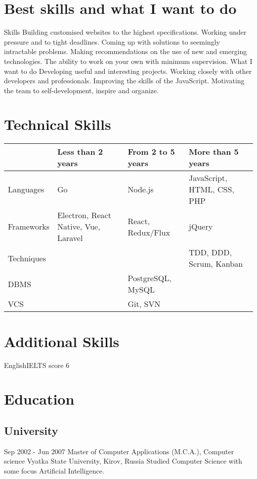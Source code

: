 \documentclass[11pt,a4paper]{moderncv}
\begin{document}
\maketitle
\section{Best skills and what I want to do}
  \cvline
    {Skills}{
      Building customised websites to the highest specifications.
      Working under pressure and to tight deadlines.
      Coming up with solutions to seemingly intractable problems.
      Making recommendations on the use of new and emerging technologies.
      The ability to work on your own with minimum supervision.}
  \cvline
    {What I want to do}{
      Developing useful and interesting projects.
      Working closely with other developers and professionals.
      Improving the skills of the JavaScript.
      Motivating the team to self-development, inspire and organize.}

\section{Technical Skills}

\begin{tabular}{ l||m{4cm}|m{4cm}|m{4cm}|  }
  & Less than 2 years & From 2 to 5 years & More than 5 years \\
  \hline\hline
  Languages & Go & Node.js & JavaScript, HTML, CSS, PHP \\
  \hline
  Frameworks & Electron, React Native, Vue, Laravel & React, Redux/Flux & jQuery \\
  \hline
  Techniques & & & TDD, DDD, Scrum, Kanban \\
  \hline
  DBMS & & PostgreSQL, MySQL & \\
  \hline
  VCS & & Git, SVN & \\
  \hline
\end{tabular}

\section{Additional Skills}
  \cvline
    {English}{IELTS score 6}

\section{Education}
  \subsection{University}
  \cventry
    {Sep 2002 - Jun 2007}
    {Master of Computer Applications (M.C.A.), Computer science}
    {\newline Vyatka State University, Kirov, Russia}
    {}{}
    {Studied Computer Science with some focus Artificial Intelligence.}
\end{document}
